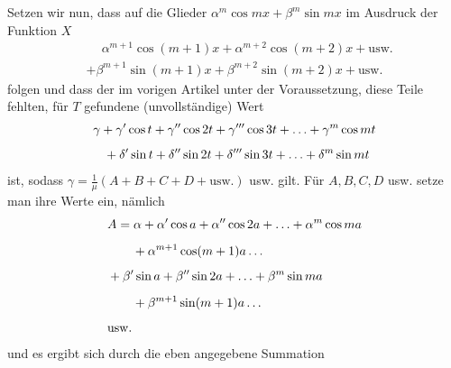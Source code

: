 Setzen wir nun, dass auf die Glieder \(\alpha^m\cos mx+\beta^m\sin mx\) im Ausdruck der Funktion \(X\)
\[
\begin{aligned}
&\phantom{{}+{}}\alpha^{m+1}\cos(m+1)x+\alpha^{m+2}\cos(m+2)x+\mathrm{usw.}\\[5pt]
&+\beta^{m+1}\sin(m+1)x+\beta^{m+2}\sin(m+2)x+\mathrm{usw.}
\end{aligned}
\]
folgen und dass der im vorigen Artikel unter der Voraussetzung, diese Teile fehlten, für \(T\) gefundene (unvollständige)
Wert
\[
\begin{aligned}
&\gamma+\gamma'\cos t+\gamma''\cos2t+\gamma'''\cos3t+\mathinner{.\,.\,.}+\gamma^m\cos mt\\[5pt]
&\phantom{\gamma}\;+\delta'\sin t+\delta''\sin2t+\delta'''\sin3t+\mathinner{.\,.\,.}+\delta^m\sin mt
\end{aligned}
\]
ist, sodass \(\gamma=\frac{1}{\mu}(A+B+C+D+\mathrm{usw.})\) usw. gilt. Für \(A,B,C,D\)
usw. setze man ihre Werte ein, nämlich
\[
\begin{aligned}
&A=\alpha+\alpha'\cos a+\alpha''\cos2a+\mathinner{.\,.\,.}+\alpha^m\cos ma\\[5pt]&\qquad{}+\alpha^{m+1}\cos(m+1)a\mathinner{.\,.\,.}\\[5pt]
&+\beta'\sin a+\beta''\sin2a+\mathinner{.\,.\,.}+\beta^m\sin ma\\[5pt]&\qquad{}+\beta^{m+1}\sin(m+1)a\mathinner{.\,.\,.}\\[5pt]
&\mathrm{usw.}
\end{aligned}
\]
und es ergibt sich durch die eben angegebene Summation
